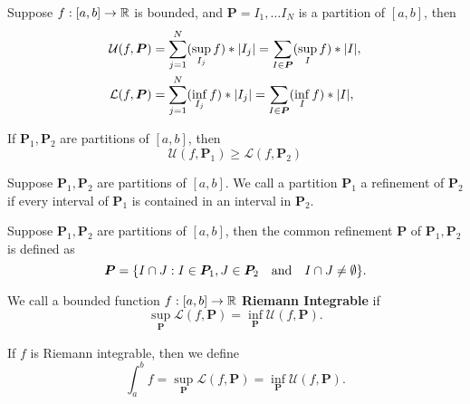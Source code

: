 \documentclass[twoside]{article}
\begin{document}
\begin{definition}
	Suppose $f : [a, b] \to \mathbb{R}$ is bounded, and $\bm{P} = {I_{1}, \dots I_{N}}$ is a partition of $[a,b]$, then
	\begin{align*}
		\mathcal{U}(f, \bm{P}) & = \sum_{j=1}^{N}(\sup_{I_{j}} f) * \abs{I_{j}} = \sum_{I \in \bm{P}} (\sup_{I} f) * \abs{I}, \\
		\mathcal{L}(f, \bm{P}) & = \sum_{j=1}^{N}(\inf_{I_{j}} f) * \abs{I_{j}} = \sum_{I \in \bm{P}} (\inf_{I} f) * \abs{I}, \\
	\end{align*}
\end{definition}

\begin{theorem}
	If $\bm{P}_{1}, \bm{P}_{2}$ are partitions of $[a,b]$, then
	\begin{equation*}
		\mathcal{U}(f, \bm{P}_{1}) \geq \mathcal{L}(f, \bm{P}_{2})
	\end{equation*}
\end{theorem}

\begin{definition}
	Suppose $\bm{P}_{1}, \bm{P}_{2}$ are partitions of $[a, b]$. We call a partition $\bm{P}_{1}$ a refinement
	of $\bm{P}_{2}$ if every interval of $\bm{P}_{1}$ is contained in an interval in $\bm{P}_{2}$.
\end{definition}

\begin{definition}
	Suppose $\bm{P}_{1}, \bm{P}_{2}$ are partitions of $[a, b]$, then the common refinement $\bm{P}$ of
	$\bm{P}_{1}, \bm{P}_{2}$ is defined as
	\begin{equation*}
		\bm{P} = \{I \cap J : I \in \bm{P}_{1}, J \in \bm{P}_{2} \quad \text{and} \quad I \cap J \neq \emptyset \}.
	\end{equation*}
\end{definition}

\begin{definition}
	We call a bounded function $f : [a,b] \to \mathbb{R}$ \textbf{Riemann Integrable} if
	\begin{equation*}
		\sup_{\bm{P}} \mathcal{L}(f, \bm{P}) = \inf_{\bm{P}} \mathcal{U}(f, \bm{P}).
	\end{equation*}

	If $f$ is Riemann integrable, then we define
	\begin{equation*}
		\int_{a}^{b} f = \sup_{\bm{P}}\mathcal{L}(f, \bm{P}) = \inf_{\bm{P}} \mathcal{U}(f, \bm{P}).
	\end{equation*}
\end{definition}
\end{document}
